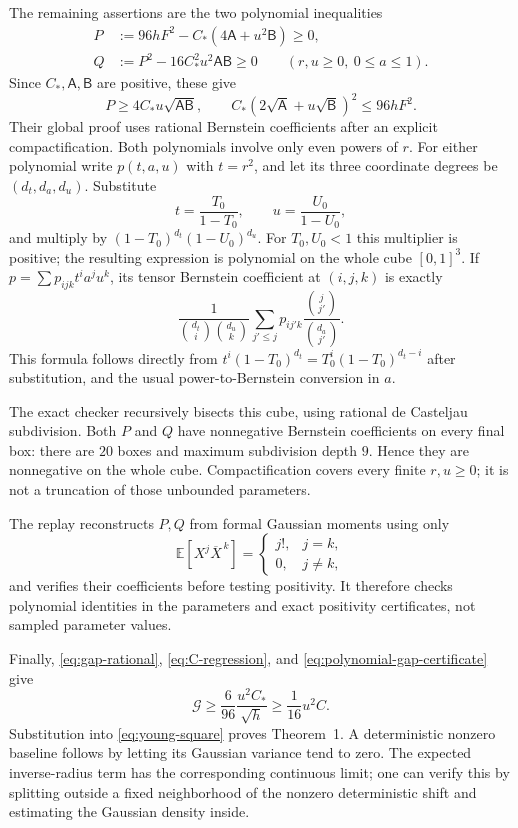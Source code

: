 The remaining assertions are the two polynomial inequalities
\begin{align}
 P&:=96hF^2-C_*(4\mathsf A+u^2\mathsf B)\ge0,\\
 Q&:=P^2-16C_*^2u^2\mathsf A\mathsf B\ge0
 \qquad(r,u\ge0,\ 0\le a\le1).
 \label{eq:polynomial-gap-certificate}
\end{align}
Since $C_*,\mathsf A,\mathsf B$ are positive, these give
\[
 P\ge4C_*u\sqrt{\mathsf A\mathsf B},\qquad
 C_*(2\sqrt{\mathsf A}+u\sqrt{\mathsf B})^2\le96hF^2.
\]
Their global proof uses rational Bernstein coefficients after an explicit
compactification.  Both polynomials involve only even powers of $r$.
For either polynomial write $p(t,a,u)$ with $t=r^2$, and let its three
coordinate degrees be $(d_t,d_a,d_u)$.  Substitute
\[
 t=\frac{T_0}{1-T_0},\qquad u=\frac{U_0}{1-U_0},
\]
and multiply by $(1-T_0)^{d_t}(1-U_0)^{d_u}$.
For $T_0,U_0<1$ this multiplier is positive; the resulting expression is
polynomial on the whole cube $[0,1]^3$.
If $p=\sum p_{ijk}t^ia^ju^k$, its tensor Bernstein coefficient at
$(i,j,k)$ is exactly
\[
 \frac{1}{\binom{d_t}{i}\binom{d_u}{k}}
 \sum_{j'\le j}p_{ij'k}\frac{\binom j{j'}}{\binom{d_a}{j'}}.
\]
This formula follows directly from
$t^i(1-T_0)^{d_t}=T_0^i(1-T_0)^{d_t-i}$ after substitution, and the usual
power-to-Bernstein conversion in $a$.

The exact checker recursively bisects this cube, using rational de
Casteljau subdivision.  Both $P$ and $Q$ have nonnegative Bernstein
coefficients on every final box: there are $20$ boxes and maximum
subdivision depth $9$.  Hence they are nonnegative on the whole cube.
Compactification covers every finite $r,u\ge0$; it is not a truncation of
those unbounded parameters.

The replay reconstructs $P,Q$ from formal Gaussian moments using only
\[
 \mathbb E[X^j\overline X^{\,k}]
 =\begin{cases}j!,&j=k,\\0,&j\ne k,\end{cases}
\]
and verifies their coefficients before testing positivity.  It therefore
checks polynomial identities in the parameters and exact positivity
certificates, not sampled parameter values.

Finally, \eqref{eq:gap-rational}, \eqref{eq:C-regression}, and
\eqref{eq:polynomial-gap-certificate} give
\[
 \mathcal G\ge\frac{6}{96}\frac{u^2C_*}{\sqrt h}
          \ge\frac1{16}u^2C.
\]
Substitution into \eqref{eq:young-square} proves Theorem~1.  A deterministic
nonzero baseline follows by letting its Gaussian variance tend to zero.
The expected inverse-radius term has the corresponding continuous limit;
one can verify this by splitting outside a fixed neighborhood of the
nonzero deterministic shift and estimating the Gaussian density inside.

